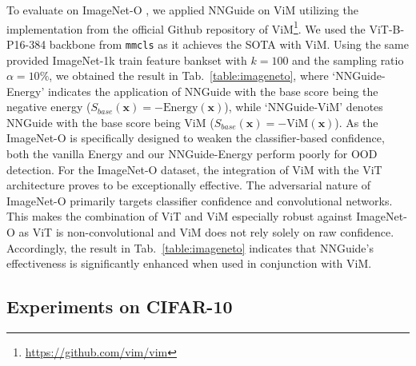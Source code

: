 \documentclass[10pt,twocolumn,letterpaper]{article}
\begin{document}
To evaluate on ImageNet-O \cite{hendrycks2021natural}, we applied NNGuide on ViM utilizing the implementation from the official Github repository of ViM\footnote{\url{https://github.com/vim/vim}}. 
We used the ViT-B-P16-384 backbone from \texttt{mmcls} as it achieves the SOTA with ViM.
Using the same provided ImageNet-1k train feature bankset with $k{=}100$ and the sampling ratio $\alpha=10\%$, we obtained the result in Tab.~\ref{table:imageneto}, where `NNGuide-Energy' indicates the application of NNGuide with the base score being the negative energy (\ie $S_{base}(\mathbf{x}) = - \text{Energy}(\mathbf{x})$), while `NNGuide-ViM' denotes NNGuide with the base score being ViM (\ie $S_{base}(\mathbf{x}) = - \text{ViM}(\mathbf{x})$). As the ImageNet-O is specifically designed to weaken the classifier-based confidence, both the vanilla Energy and our NNGuide-Energy perform poorly for OOD detection. 
For the ImageNet-O dataset, the integration of ViM with the ViT architecture proves to be exceptionally effective. The adversarial nature of ImageNet-O primarily targets classifier confidence and convolutional networks. This makes the combination of ViT and ViM especially robust against ImageNet-O as ViT is non-convolutional and ViM does not rely solely on raw confidence. Accordingly, the result in Tab.~\ref{table:imageneto} indicates that NNGuide's effectiveness is significantly enhanced when used in conjunction with ViM.





\subsection{Experiments on CIFAR-10}

\begin{table}[t]
\centering
{}
\caption{The result of NNGuide on CIFAR-10 (ID) in (FPR95$\downarrow$ / AUROC$\uparrow$)}
\label{table:cifar10}
\end{table}
\end{document}
